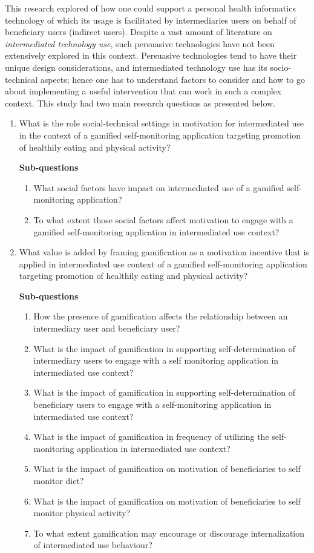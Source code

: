 This research explored of how one could support a personal health informatics technology of which its usage is facilitated by intermediaries users on behalf of beneficiary users (indirect users). Despite a vast amount of literature on \emph{intermediated technology use}, such persuasive technologies have not been extensively explored in this context. Persuasive technologies tend to have their unique design considerations, and intermediated technology use has its socio-technical aspects; hence one has to understand factors to consider and how to go about implementing a useful intervention that can work in such a complex context. This study had two main research questions as presented below.
\begin{enumerate}
\item What is the role social-technical settings in motivation for intermediated use in the context of a gamified self-monitoring application targeting promotion of healthily eating and physical activity?

\textbf{Sub-questions}
\begin{enumerate}[label=\alph*.]
\item What social factors have impact on intermediated use of a gamified self-monitoring application?
\item To what extent those social factors affect motivation to engage with a gamified self-monitoring application in intermediated use context?
\end{enumerate}
\item What value is added by framing gamification as a motivation incentive that is applied in intermediated use context of a gamified self-monitoring application targeting promotion of healthily eating and physical activity?

\textbf{Sub-questions}
\begin{enumerate}[label=\alph*.]
\item How the presence of gamification affects the relationship between an intermediary user and beneficiary user?
\item What is the impact of gamification in supporting self-determination of intermediary users to engage with a self monitoring application in intermediated use context?
\item What is the impact of gamification in supporting self-determination of beneficiary users to engage with a self-monitoring application in intermediated use context?
\item What is the impact of gamification in frequency of utilizing the self-monitoring application in intermediated use context?
\item What is the impact of gamification on motivation of beneficiaries to self monitor diet?
\item What is the impact of gamification on motivation of beneficiaries to self monitor physical activity?
\item To what extent gamification may encourage or discourage internalization of intermediated use behaviour?
\end{enumerate}
\end{enumerate}  
